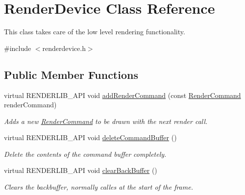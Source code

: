 \hypertarget{class_render_device}{}\section{Render\+Device Class Reference}
\label{class_render_device}


This class takes care of the low level rendering functionality.  




{\ttfamily \#include $<$renderdevice.\+h$>$}

\subsection*{Public Member Functions}
\begin{DoxyCompactItemize}
\item 
\mbox{\label{class_render_device_a832c832817e9cb66ef47b9a4d31fea7f}} 
virtual R\+E\+N\+D\+E\+R\+L\+I\+B\+\_\+\+A\+PI void \hyperlink{class_render_device_a832c832817e9cb66ef47b9a4d31fea7f}{add\+Render\+Command} (const \hyperlink{class_render_command}{Render\+Command} render\+Command)
\begin{DoxyCompactList}\small\item\em Adds a new \hyperlink{class_render_command}{Render\+Command} to be drawn with the next render call. \end{DoxyCompactList}\item 
\mbox{\label{class_render_device_adbd93497804bf59ce6b7293ef2013474}} 
virtual R\+E\+N\+D\+E\+R\+L\+I\+B\+\_\+\+A\+PI void \hyperlink{class_render_device_adbd93497804bf59ce6b7293ef2013474}{delete\+Command\+Buffer} ()
\begin{DoxyCompactList}\small\item\em Delete the contents of the command buffer completely. \end{DoxyCompactList}\item 
\mbox{\label{class_render_device_ac84317cc89afb5ce04c0c40d6da2fd70}} 
virtual R\+E\+N\+D\+E\+R\+L\+I\+B\+\_\+\+A\+PI void \hyperlink{class_render_device_ac84317cc89afb5ce04c0c40d6da2fd70}{clear\+Back\+Buffer} ()
\begin{DoxyCompactList}\small\item\em Clears the backbuffer, normally calles at the start of the frame. \end{DoxyCompactList}\item 

\end{DoxyCompactItemize}
